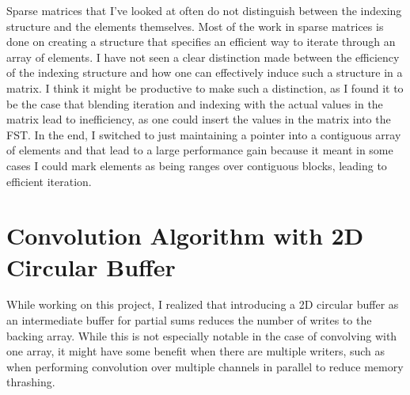 \documentclass[12pt]{article}
\begin{document}
Sparse matrices that I've looked at often do not distinguish between the indexing structure and
the elements themselves. Most of the work in sparse matrices is done on creating a structure
that specifies an efficient way to iterate through an array of elements. I have not seen a clear
distinction made between the efficiency of the indexing structure and how one can effectively
induce such a structure in a matrix. I think it might be productive to make such a distinction,
as I found it to be the case that blending iteration and indexing with the actual values in the
matrix lead to inefficiency, as one could insert the values in the matrix into the FST. In the
end, I switched to just maintaining a pointer into a contiguous array of elements and that lead
to a large performance gain because it meant in some cases I could mark elements as being ranges
over contiguous blocks, leading to efficient iteration.

\section{Convolution Algorithm with 2D Circular Buffer}
While working on this project, I realized that introducing a 2D circular buffer as an
intermediate buffer for partial sums reduces the
number of writes to the backing array. While this is not especially notable in the case of
convolving with one array, it might have some benefit when there are multiple writers, such as
when performing convolution over multiple channels in parallel to reduce memory thrashing.
\end{document}
